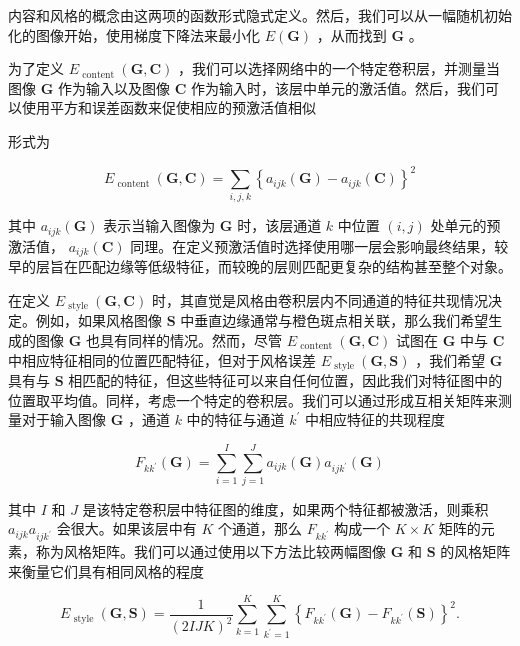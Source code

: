 \documentclass[10pt]{article}
\begin{document}
内容和风格的概念由这两项的函数形式隐式定义。然后，我们可以从一幅随机初始化的图像开始，使用梯度下降法来最小化 \(E\left( \mathbf{G}\right)\) ，从而找到 \(\mathbf{G}\) 。

为了定义 \({E}_{\text{ content }}\left( {\mathbf{G},\mathbf{C}}\right)\) ，我们可以选择网络中的一个特定卷积层，并测量当图像 \(\mathbf{G}\) 作为输入以及图像 \(\mathbf{C}\) 作为输入时，该层中单元的激活值。然后，我们可以使用平方和误差函数来促使相应的预激活值相似

形式为

\[
{E}_{\text{ content }}\left( {\mathbf{G},\mathbf{C}}\right)  = \mathop{\sum }\limits_{{i,j,k}}{\left\{  {a}_{ijk}\left( \mathbf{G}\right)  - {a}_{ijk}\left( \mathbf{C}\right) \right\}  }^{2} \tag{10.14}
\]

其中 \({a}_{ijk}\left( \mathbf{G}\right)\) 表示当输入图像为 \(\mathbf{G}\) 时，该层通道 \(k\) 中位置 \(\left( {i,j}\right)\) 处单元的预激活值， \({a}_{ijk}\left( \mathbf{C}\right)\) 同理。在定义预激活值时选择使用哪一层会影响最终结果，较早的层旨在匹配边缘等低级特征，而较晚的层则匹配更复杂的结构甚至整个对象。

在定义 \({E}_{\text{ style }}\left( {\mathbf{G},\mathbf{C}}\right)\) 时，其直觉是风格由卷积层内不同通道的特征共现情况决定。例如，如果风格图像 \(\mathbf{S}\) 中垂直边缘通常与橙色斑点相关联，那么我们希望生成的图像 \(\mathbf{G}\) 也具有同样的情况。然而，尽管 \({E}_{\text{ content }}\left( {\mathbf{G},\mathbf{C}}\right)\) 试图在 \(\mathbf{G}\) 中与 \(\mathbf{C}\) 中相应特征相同的位置匹配特征，但对于风格误差 \({E}_{\text{ style }}\left( {\mathbf{G},\mathbf{S}}\right)\) ，我们希望 \(\mathbf{G}\) 具有与 \(\mathbf{S}\) 相匹配的特征，但这些特征可以来自任何位置，因此我们对特征图中的位置取平均值。同样，考虑一个特定的卷积层。我们可以通过形成互相关矩阵来测量对于输入图像 \(\mathbf{G}\) ，通道 \(k\) 中的特征与通道 \({k}^{\prime }\) 中相应特征的共现程度

\[
{F}_{k{k}^{\prime }}\left( \mathbf{G}\right)  = \mathop{\sum }\limits_{{i = 1}}^{I}\mathop{\sum }\limits_{{j = 1}}^{J}{a}_{ijk}\left( \mathbf{G}\right) {a}_{{ij}{k}^{\prime }}\left( \mathbf{G}\right)  \tag{10.15}
\]

其中 \(I\) 和 \(J\) 是该特定卷积层中特征图的维度，如果两个特征都被激活，则乘积 \({a}_{ijk}{a}_{{ij}{k}^{\prime }}\) 会很大。如果该层中有 \(K\) 个通道，那么 \({F}_{k{k}^{\prime }}\) 构成一个 \(K \times  K\) 矩阵的元素，称为风格矩阵。我们可以通过使用以下方法比较两幅图像 \(\mathbf{G}\) 和 \(\mathbf{S}\) 的风格矩阵来衡量它们具有相同风格的程度

\[
{E}_{\text{ style }}\left( {\mathbf{G},\mathbf{S}}\right)  = \frac{1}{{\left( 2IJK\right) }^{2}}\mathop{\sum }\limits_{{k = 1}}^{K}\mathop{\sum }\limits_{{{k}^{\prime } = 1}}^{K}{\left\{  {F}_{k{k}^{\prime }}\left( \mathbf{G}\right)  - {F}_{k{k}^{\prime }}\left( \mathbf{S}\right) \right\}  }^{2}. \tag{10.16}
\]
\end{document}
